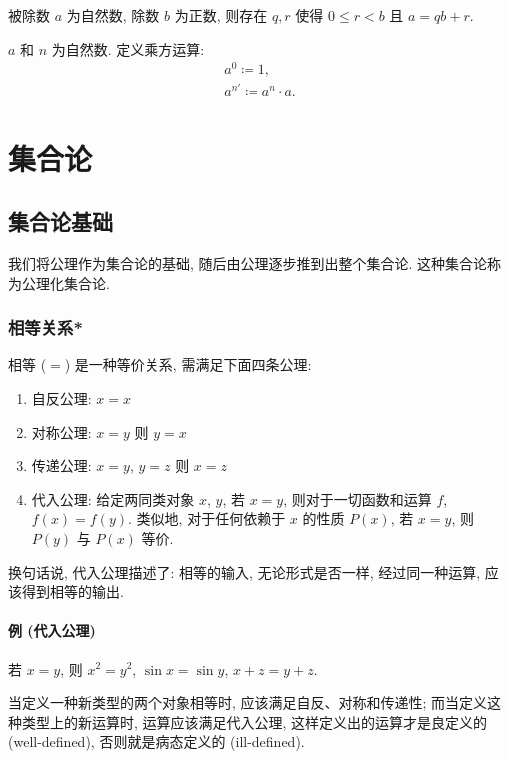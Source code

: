 \documentclass[UTF8]{ctexart}
\theoremstyle{mystyle}
\theoremstyle{myremark}
\theoremstyle{plain}
\begin{document}
\begin{definition}
    被除数 $ a $ 为自然数, 除数 $ b $ 为正数, 则存在 $ q, r $ 使得 $ 0 \leqslant r < b $ 且 $ a = q b + r $.
\end{definition}


\begin{definition}
    $ a $ 和 $ n $ 为自然数. 定义乘方运算:
    \[ 
        \begin{array}{c}
            a^0 \coloneqq 1, \\
            a^{n'} \coloneqq a^n \cdot a .
        \end{array}    
    \]
\end{definition}

\section{集合论}
\subsection{集合论基础}
我们将公理作为集合论的基础, 随后由公理逐步推到出整个集合论. 这种集合论称为公理化集合论.

\subsubsection{相等关系*} 
相等 ($ = $) 是一种等价关系, 需满足下面四条公理:
\begin{enumerate}
    \item 自反公理: $ x = x $
    \item 对称公理: $ x = y $ 则 $ y = x $
    \item 传递公理: $ x = y $, $ y = z $ 则 $ x = z $
    \item 代入公理: 给定两同类对象 $ x $, $ y $, 若 $ x = y $, 则对于一切函数和运算 $ f $, $ f(x) = f(y) $. 类似地, 对于任何依赖于 $ x $ 的性质 $ P(x) $, 若 $ x = y $, 则 $ P(y) $ 与 $ P(x) $ 等价.
\end{enumerate}

换句话说, 代入公理描述了: 相等的输入, 无论形式是否一样, 经过同一种运算, 应该得到相等的输出.

\paragraph{例 (代入公理)} 若 $ x = y $, 则 $ x^2 = y^2 $, $ \sin x = \sin y $, $ x + z = y + z $.

当定义一种新类型的两个对象相等时, 应该满足自反、对称和传递性; 而当定义这种类型上的新运算时, 运算应该满足代入公理, 这样定义出的运算才是良定义的 (well-defined), 否则就是病态定义的 (ill-defined).
\end{document}
